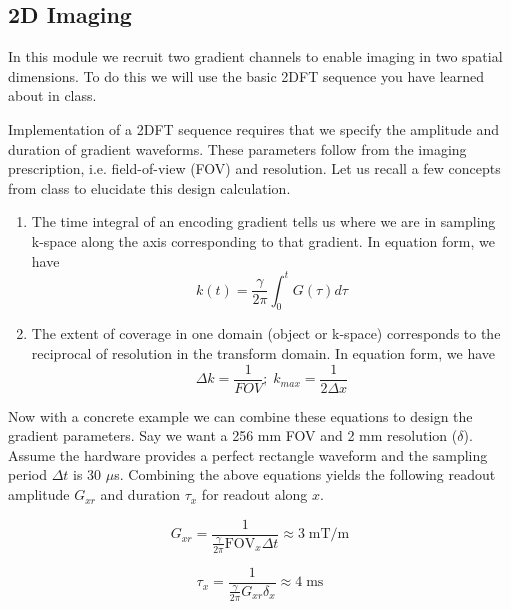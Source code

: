 \newpage
\subsection{2D Imaging}

In this module we recruit two gradient channels to enable imaging in two spatial dimensions. To do this we will use the basic 2DFT sequence you have learned about in class.

Implementation of a 2DFT sequence requires that we specify the amplitude and duration of gradient waveforms. These parameters follow from the imaging prescription, i.e. field-of-view (FOV) and resolution. Let us recall a few concepts from class to elucidate this design calculation.

\begin{enumerate}
    \item   The time integral of an encoding gradient tells us where we are in sampling k-space along the axis corresponding to that gradient. In equation form, we have
    \begin{equation}
        k(t)=\frac{\gamma}{2\pi} \int_{0}^{t} G(\tau) d\tau
    \end{equation}
    \item   The extent of coverage in one domain (object or k-space) corresponds to the reciprocal of resolution in the transform domain. In equation form, we have
    \begin{equation}
        \Delta k=\frac{1}{FOV}; \; k_{max}=\frac{1}{2\Delta x}
    \end{equation}
\end{enumerate}

Now with a concrete example we can combine these equations to design the gradient parameters. Say we want a 256 mm FOV and 2 mm resolution ($\delta$). Assume the hardware provides a perfect rectangle waveform and the sampling period $\Delta t$ is 30 $\mu$s. Combining the above equations yields the following readout amplitude $G_{xr}$ and duration $\tau_x$ for readout along $x$.

\begin{equation*}
    G_{xr}=\frac{1}{\frac{\gamma}{2\pi} \text{FOV}_x \Delta t} \approx 3 \; \text{mT/m}
\end{equation*}

\begin{equation*}
    \tau_x=\frac{1}{\frac{\gamma}{2\pi}G_{xr} \delta_x} \approx 4 \; \text{ms}
\end{equation*}

